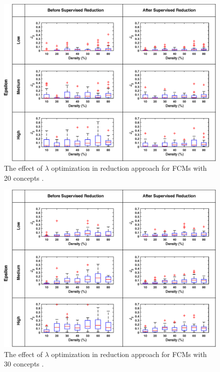 \documentclass[graybox]{svmult}
\begin{document}
\begin{figure}[hbt]
  \includegraphics[width=\textwidth]{j2_sup_c20.eps}
  \caption{The effect of $\lambda$ optimization in reduction approach for 
  FCMs with 20 concepts \cite{hatwagner2018two}.}
  \label{fig:learning20}
\end{figure}

\begin{figure}[hbt]
  \includegraphics[width=\textwidth]{j2_sup_c30.eps}
  \caption{The effect of $\lambda$ optimization in reduction approach for 
  FCMs with 30 concepts \cite{hatwagner2018two}.}
  \label{fig:learning30}
\end{figure}
\end{document}

